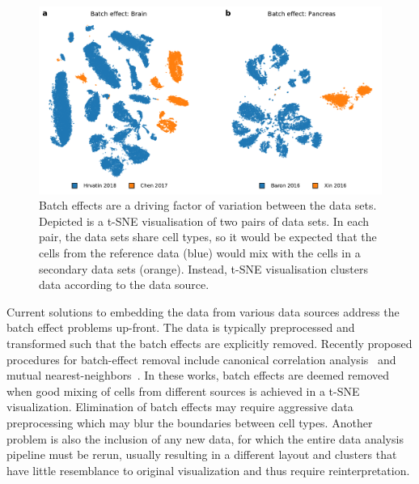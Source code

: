 \documentclass[runningheads]{llncs}
\begin{document}
\begin{figure}[htbp]
\includegraphics[width=\textwidth]{figures/batch_effect.pdf}
\caption{Batch effects are a driving factor of variation between the data sets.
Depicted is a t-SNE visualisation of two pairs of data sets. In each pair, the
data sets share cell types, so it would be expected that the cells from the
reference data (blue) would mix with the cells in a secondary data sets
(orange). Instead, t-SNE visualisation clusters data according to the data
source.} \label{fig:batch_effect}
\end{figure}

Current solutions to embedding the data from various data sources address the
batch effect problems up-front. The data is typically preprocessed and
transformed such that the batch effects are explicitly
removed. Recently proposed procedures for batch-effect removal include
canonical correlation analysis~\cite{cca} and mutual
nearest-neighbors~\cite{mnn,seurat}.
In these works, batch effects are deemed removed when good mixing of cells from different sources is achieved in a t-SNE visualization.
Elimination of batch effects may require aggressive data
preprocessing which may blur the boundaries between cell types. Another problem
is also the inclusion of any new data, for which the entire data analysis
pipeline must be rerun, usually resulting in a different layout and clusters
that have little resemblance to original visualization and thus require
reinterpretation.
\end{document}
